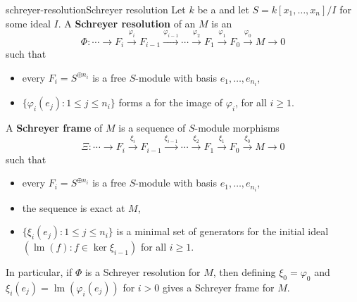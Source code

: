 \begin{topic}{schreyer-resolution}{Schreyer resolution}
    Let $k$ be a  and let $S = k[x_1, \ldots, x_n] / I$ for some ideal $I$.
    A \textbf{Schreyer resolution} of an  $M$ is an 
    \[ \Phi : \cdots \to F_i \xrightarrow{\varphi_i} F_{i - 1} \xrightarrow{\varphi_{i - 1}} \cdots \xrightarrow{\varphi_2} F_1 \xrightarrow{\varphi_1} F_0 \xrightarrow{\varphi_0} M \to 0 \]
    such that
    \begin{itemize}
        \item every $F_i = S^{\oplus n_i}$ is a free $S$-module with basis $e_1, \ldots, e_{n_i}$,
        \item $\{ \varphi_i(e_j) : 1 \le j \le n_i \}$ forms a  for the image of $\varphi_i$, for all $i \ge 1$.
    \end{itemize}
    
    A \textbf{Schreyer frame} of $M$ is a sequence of $S$-module morphisms
    \[ \Xi : \cdots \to F_i \xrightarrow{\xi_i} F_{i - 1} \xrightarrow{\xi_{i - 1}} \cdots \xrightarrow{\xi_2} F_1 \xrightarrow{\xi_1} F_0 \xrightarrow{\xi_0} M \to 0 \]
    such that
    \begin{itemize}
        \item every $F_i = S^{\oplus n_i}$ is a free $S$-module with basis $e_1, \ldots, e_{n_i}$,
        \item the sequence is exact at $M$,
        \item $\{ \xi_i(e_j) : 1 \le j \le n_i \}$ is a minimal set of generators for the initial ideal $(\operatorname{lm}(f) : f \in \ker \xi_{i - 1})$ for all $i \ge 1$.
    \end{itemize}
    In particular, if $\Phi$ is a Schreyer resolution for $M$, then defining $\xi_0 = \varphi_0$ and $\xi_i(e_j) = \operatorname{lm}(\varphi_i(e_j))$ for $i > 0$ gives a Schreyer frame for $M$.
\end{topic}

